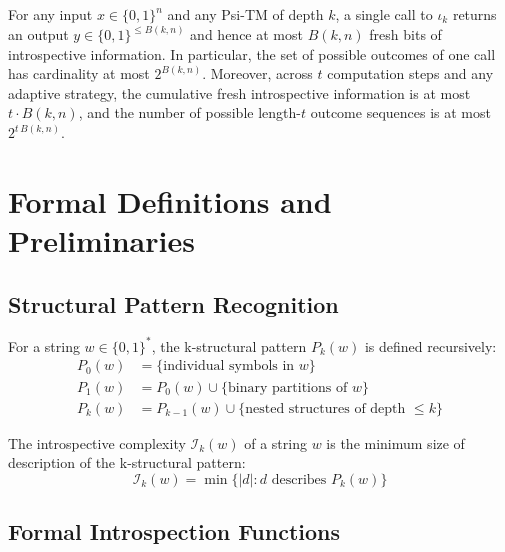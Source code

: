 
\begin{lemma}
\label{lem:one-step-budget-2}
For any input $x\in\{0,1\}^n$ and any Psi-TM of depth $k$, a single call to $\iota_k$ returns an output $y\in\{0,1\}^{\le B(k,n)}$ and hence at most $B(k,n)$ fresh bits of introspective information. In particular, the set of possible outcomes of one call has cardinality at most $2^{B(k,n)}$. Moreover, across $t$ computation steps and any adaptive strategy, the cumulative fresh introspective information is at most $t\cdot B(k,n)$, and the number of possible length-$t$ outcome sequences is at most $2^{t\,B(k,n)}$.
\end{lemma}

\section{Formal Definitions and Preliminaries}

\subsection{Structural Pattern Recognition}

\begin{definition}
For a string $w \in \{0,1\}^*$, the k-structural pattern $P_k(w)$ is defined recursively:
\begin{align*}
P_0(w) &= \{\text{individual symbols in } w\} \\
P_1(w) &= P_0(w) \cup \{\text{binary partitions of } w\} \\
P_k(w) &= P_{k-1}(w) \cup \{\text{nested structures of depth } \leq k\}
\end{align*}
\end{definition}

\begin{definition}
The introspective complexity $\mathcal{I}_k(w)$ of a string $w$ is the minimum size of description of the k-structural pattern:
$$\mathcal{I}_k(w) = \min\{|d| : d \text{ describes } P_k(w)\}$$
\end{definition}

\subsection{Formal Introspection Functions}

